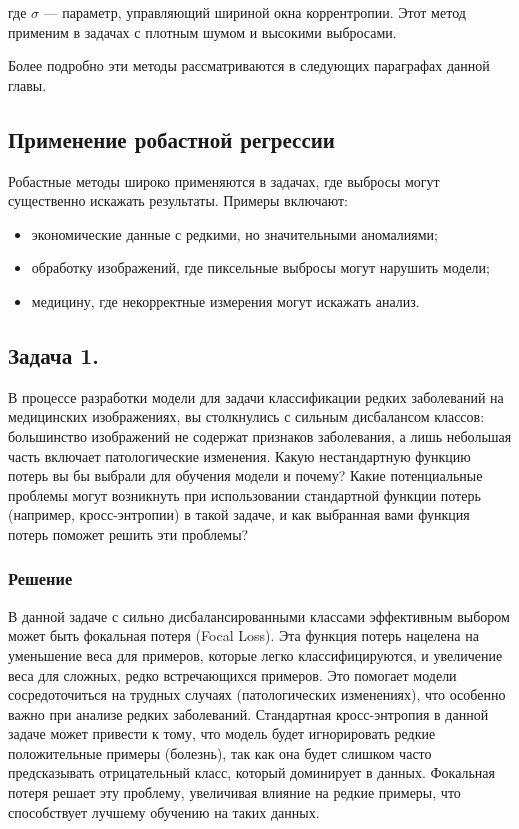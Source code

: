 где $\sigma$ — параметр, управляющий шириной окна коррентропии. Этот метод применим в задачах с плотным шумом и высокими выбросами.

Более подробно эти методы рассматриваются в следующих параграфах данной главы.

\subsection*{Применение робастной регрессии}
Робастные методы широко применяются в задачах, где выбросы могут существенно искажать результаты. Примеры включают:
\begin{itemize}
\item экономические данные с редкими, но значительными аномалиями;
\item обработку изображений, где пиксельные выбросы могут нарушить модели;
\item медицину, где некорректные измерения могут искажать анализ.
\end{itemize}


\subsection*{Задача 1.}
В процессе разработки модели для задачи классификации редких заболеваний на медицинских изображениях, вы столкнулись с сильным дисбалансом классов: большинство изображений не содержат признаков заболевания, а лишь небольшая часть включает патологические изменения. Какую нестандартную функцию потерь вы бы выбрали для обучения модели и почему? Какие потенциальные проблемы могут возникнуть при использовании стандартной функции потерь (например, кросс-энтропии) в такой задаче, и как выбранная вами функция потерь поможет решить эти проблемы?

\subsubsection*{Решение}
В данной задаче с сильно дисбалансированными классами эффективным выбором может быть фокальная потеря (Focal Loss). Эта функция потерь нацелена на уменьшение веса для примеров, которые легко классифицируются, и увеличение веса для сложных, редко встречающихся примеров. Это помогает модели сосредоточиться на трудных случаях (патологических изменениях), что особенно важно при анализе редких заболеваний. Стандартная кросс-энтропия в данной задаче может привести к тому, что модель будет игнорировать редкие положительные примеры (болезнь), так как она будет слишком часто предсказывать отрицательный класс, который доминирует в данных. Фокальная потеря решает эту проблему, увеличивая влияние на редкие примеры, что способствует лучшему обучению на таких данных.

